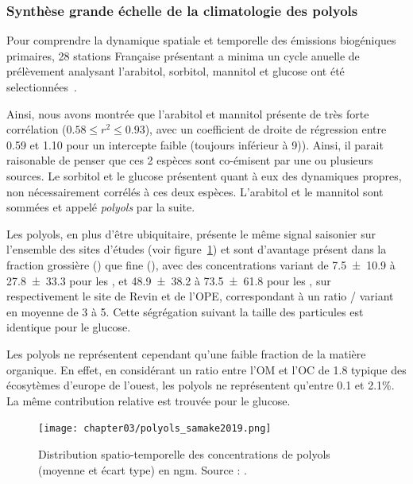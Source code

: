 \subsubsection{Synthèse grande échelle de la climatologie des polyols}%
\label{ssub:synthèse_grande_échelle_de_la_climatologie_des_polyols}

Pour comprendre la dynamique spatiale et temporelle des émissions biogéniques primaires,
28 stations Française présentant a minima un cycle anuelle de prélèvement analysant
l'arabitol, sorbitol, mannitol et glucose ont été
selectionnées~\autocite{samakePolyols2019}.

Ainsi, nous avons montrée que l'arabitol et mannitol présente de très forte corrélation 
($0.58 \leq r^2 \leq 0.93$), avec un coefficient de droite de régression entre 0.59 et 1.10 pour un
intercepte faible (toujours inférieur à \SI{9}{\ngm})). Ainsi, il parait raisonable de
penser que ces 2 espèces sont co-émisent par une ou plusieurs sources.
Le sorbitol et le glucose présentent quant à eux des dynamiques propres, non nécessairement corrélés à ces
deux espèces.
L'arabitol et le mannitol sont sommées et appelé \textit{polyols} par la suite.

Les polyols, en plus d'être ubiquitaire, présente le même signal saisonier sur l'ensemble
des sites d'études (voir figure~\ref{fig:polyols_samake2019}) et sont d'avantage présent
dans la fraction grossière (\PMdix) que fine (\PMdc), avec des concentrations variant de 
\SI{7.5\pm10.9}{\ngm} à \SI{27.8\pm33.3}{\ngm} pour les \PMdc, et
\SI{48.9\pm38.2}{\ngm} à \SI{73.5\pm61.8}{\ngm} pour les \PMdix, sur respectivement le site de
Revin et de l'OPE, correspondant à un ratio \PMdix/\PMdc{} variant en moyenne de 3 à 5.
Cette ségrégation suivant la taille des particules est identique pour le glucose.

Les polyols ne représentent cependant qu'une faible fraction de la matière organique. En effet, en
considérant un ratio entre l'OM et l'OC de 1.8 typique des écosytèmes d'europe de
l'ouest, les polyols ne représentent qu'entre 0.1 et 2.1\%. La même contribution relative
est trouvée pour le glucose.

\begin{figure}[ht]
    \centering
    \texttt{[image: chapter03/polyols\_samake2019.png]}
    \caption{
        Distribution spatio-temporelle des concentrations de polyols (moyenne et écart
        type) en \si{ngm}.
        Source : \cite[figure 6]{samakePolyols2019}.
    }%
    \label{fig:polyols_samake2019}
\end{figure}

